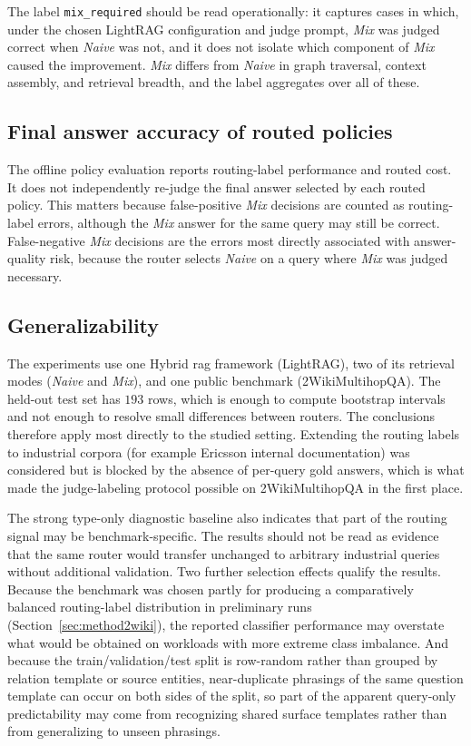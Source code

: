 \documentclass[english, bibtex]{kththesis}               %
\numberwithin{listing}{chapter}
\begin{document}
The label \texttt{mix\_required} should be read operationally: it captures cases in which, under the chosen LightRAG configuration and judge prompt, \emph{Mix} was judged correct when \emph{Naive} was not, and it does not isolate which component of \emph{Mix} caused the improvement. \emph{Mix} differs from \emph{Naive} in graph traversal, context assembly, and retrieval breadth, and the label aggregates over all of these.

\subsection{Final answer accuracy of routed policies}
\label{sec:limitFinalAnswerAccuracy}

The offline policy evaluation reports routing-label performance and routed cost. It does not independently re-judge the final answer selected by each routed policy. This matters because false-positive \emph{Mix} decisions are counted as routing-label errors, although the \emph{Mix} answer for the same query may still be correct. False-negative \emph{Mix} decisions are the errors most directly associated with answer-quality risk, because the router selects \emph{Naive} on a query where \emph{Mix} was judged necessary.

\subsection{Generalizability}
\label{sec:limitGeneralizability}

The experiments use one Hybrid \gls{rag} framework (LightRAG), two of its retrieval modes (\emph{Naive} and \emph{Mix}), and one public benchmark (2WikiMultihopQA). The held-out test set has $193$ rows, which is enough to compute bootstrap intervals and not enough to resolve small differences between routers. The conclusions therefore apply most directly to the studied setting. Extending the routing labels to industrial corpora (for example Ericsson internal documentation) was considered but is blocked by the absence of per-query gold answers, which is what made the judge-labeling protocol possible on 2WikiMultihopQA in the first place.

The strong type-only diagnostic baseline also indicates that part of the routing signal may be benchmark-specific. The results should not be read as evidence that the same router would transfer unchanged to arbitrary industrial queries without additional validation. Two further selection effects qualify the results. Because the benchmark was chosen partly for producing a comparatively balanced routing-label distribution in preliminary runs (Section~\ref{sec:method2wiki}), the reported classifier performance may overstate what would be obtained on workloads with more extreme class imbalance. And because the train/validation/test split is row-random rather than grouped by relation template or source entities, near-duplicate phrasings of the same question template can occur on both sides of the split, so part of the apparent query-only predictability may come from recognizing shared surface templates rather than from generalizing to unseen phrasings.
\end{document}
